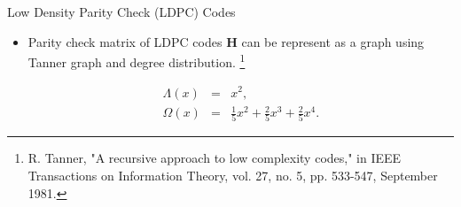 \documentclass[11pt, aspectratio=169]{beamer}
\newcommand\blfootnote[1]{%
  \begingroup
  \renewcommand\thefootnote{}\footnote{#1}%
  \addtocounter{footnote}{-1}%
  \endgroup
}
\begin{document}
\begin{frame}{Low Density Parity Check (LDPC) Codes}
{\begin{itemize}
			\item Parity check matrix of LDPC codes $\mathbf{H}$ can be represent as a graph using Tanner graph and degree distribution.\blfootnote{\tiny R. Tanner, "A recursive approach to low complexity codes," in IEEE Transactions on Information Theory, vol. 27, no. 5, pp. 533-547, September 1981.
			} 
				\begin{eqnarray}
			\Lambda (x) &=& x^2, \\
			\Omega(x) &=& \frac{1}{5}x^{2}+\frac{2}{5}x^{3}+\frac{2}{5}x^{4}.
			\end{eqnarray}
		\end{itemize}
	}
%		
%		
\end{frame}
\end{document}
